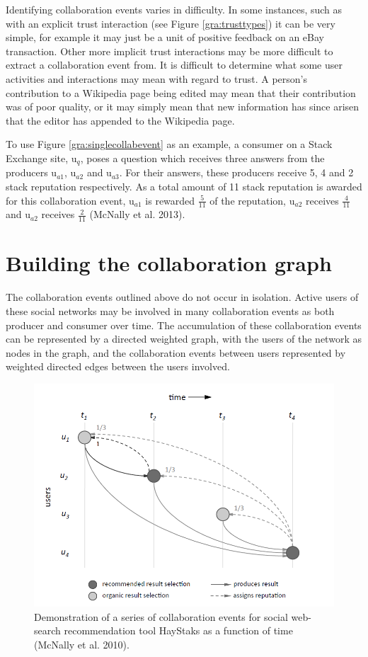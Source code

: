 \documentclass[]{final_report}
\begin{document}
Identifying collaboration events varies in difficulty. In some instances, such as with an explicit trust interaction (see Figure \ref{gra:trusttypes}) it can be very simple, for example it may just be a unit of positive feedback on an eBay transaction. Other more implicit trust interactions may be more difficult to extract a collaboration event from. It is difficult to determine what some user activities and interactions may mean with regard to trust. A person's contribution to a Wikipedia page being edited may mean that their contribution was of poor quality, or it may simply mean that new information has since arisen that the editor has appended to the Wikipedia page.

To use Figure \ref{gra:singlecollabevent} as an example, a consumer on a Stack Exchange site, u$_{q}$, poses a question which receives three answers from the producers u$_{a1}$, u$_{a2}$ and u$_{a3}$. For their answers, these producers receive 5, 4 and 2 stack reputation respectively. As a total amount of 11 stack reputation is awarded for this collaboration event, u$_{a1}$ is rewarded $\frac{5}{11}$ of the reputation, u$_{a2}$ receives $\frac{4}{11}$ and u$_{a2}$ receives $\frac{2}{11}$ (McNally et al. 2013).

\section{Building the collaboration graph}

The collaboration events outlined above do not occur in isolation. Active users of these social networks may be involved in many collaboration events as both producer and consumer over time. The accumulation of these collaboration events can be represented by a directed weighted graph, with the users of the network as nodes in the graph, and the collaboration events between users represented by weighted directed edges between the users involved.

\begin{figure}[ht!]
\centering
\includegraphics[width=130mm]{chap3/collabeventstime.png}
\caption{Demonstration of a series of collaboration events for social web-search recommendation tool HayStaks as a function of time (McNally et al. 2010).}
\end{figure}\label{gra:collabtime}
\end{document}
